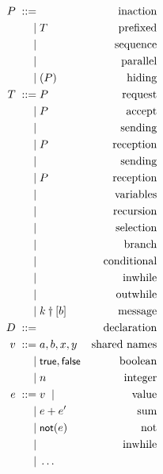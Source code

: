 \documentclass{article}
\begin{document}
\begin{align*}
  P \grmeq & \inact                       & \text{inaction}\\
    \grmor & T                            & \text{prefixed}\\
    \grmor & \seqcomp PQ                  & \text{sequence}\\
    \grmor & \parcomp PQ                  & \text{parallel}\\
    \grmor & \restrict uP                 & \text{hiding}\\
  T \grmeq & \request akP                 & \text{request}\\
    \grmor & \accept akP                  & \text{accept}\\
    \grmor & \send{k}{e}{}                & \text{sending}\\
    \grmor & \recv kxP                    & \text{reception}\\
    \grmor & \hosend k{k'}{}              & \text{sending}\\
    \grmor & \horecv k{k'}P               & \text{reception}\\
    \grmor & \vars Xek                    & \text{variables}\\
    \grmor & \recur DP                    & \text{recursion}\\
    \grmor & \select kl                   & \text{selection}\\
    \grmor & \branch klP                  & \text{branch}\\
    \grmor & \cond ePQ                    & \text{conditional}\\
    \grmor & \inwhile {\channelsFromTo k1n}Q & \text{inwhile}\\
    \grmor & \outwhile{\channelsFromTo k1n}eP& \text{outwhile}\\
    \grmor & k\dagger[b]                  & \text{message}\\
  D \grmeq & \declare XxkP                & \text{declaration}\\
  v \grmeq & a, b, x, y                   & \text{shared names}\\
    \grmor & \truek, \falsek              & \text{boolean}\\
    \grmor & n                            & \text{integer}\\
  e \grmeq & v \grmor                     & \text{value}\\
    \grmor & e + e'                       & \text{sum}\\
    \grmor & \notk(e)                     & \text{not}\\
    \grmor & \inwhilee {\channelsFromTo k1n} & \text{inwhile}\\
    \grmor & \dots                        \\
\end{align*}
\end{document}
